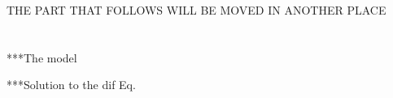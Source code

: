 \documentclass{article}
\newcommand{\statessymbol}{\mathcal{X}}
\newcommand{\stateset}{\statessymbol}
\begin{document}





THE PART THAT FOLLOWS WILL BE MOVED IN ANOTHER PLACE\\\\\\

***The model

***Solution to the dif Eq.



\end{document}
